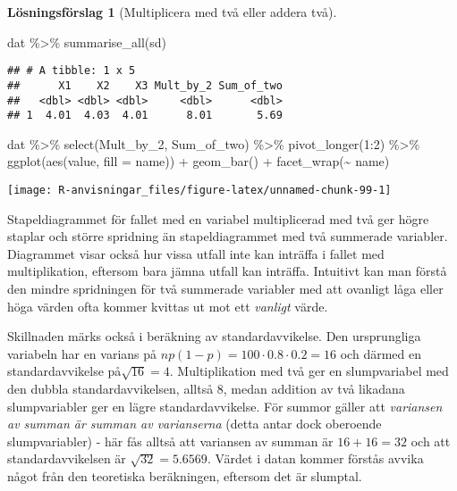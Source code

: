 \documentclass[
]{book}
\newenvironment{Shaded}{\begin{snugshade}}{\end{snugshade}}
\newcommand{\AttributeTok}[1]{\textcolor[rgb]{0.77,0.63,0.00}{#1}}
\newcommand{\DecValTok}[1]{\textcolor[rgb]{0.00,0.00,0.81}{#1}}
\newcommand{\FunctionTok}[1]{\textcolor[rgb]{0.00,0.00,0.00}{#1}}
\newcommand{\NormalTok}[1]{#1}
\newcommand{\SpecialCharTok}[1]{\textcolor[rgb]{0.00,0.00,0.00}{#1}}
\theoremstyle{definition}
\theoremstyle{definition}
\theoremstyle{definition}
\theoremstyle{definition}
\newtheorem{hypothesis}{Lösningsförslag}[chapter]
\theoremstyle{remark}
\begin{document}
\begin{hypothesis}[Multiplicera med två eller addera två]
\begin{Shaded}
\begin{Highlighting}[]
\NormalTok{dat }\SpecialCharTok{\%\textgreater{}\%} 
  \FunctionTok{summarise\_all}\NormalTok{(sd)}
\end{Highlighting}
\end{Shaded}

\begin{verbatim}
## # A tibble: 1 x 5
##      X1    X2    X3 Mult_by_2 Sum_of_two
##   <dbl> <dbl> <dbl>     <dbl>      <dbl>
## 1  4.01  4.03  4.01      8.01       5.69
\end{verbatim}

\begin{Shaded}
\begin{Highlighting}[]
\NormalTok{dat }\SpecialCharTok{\%\textgreater{}\%} 
  \FunctionTok{select}\NormalTok{(Mult\_by\_2, Sum\_of\_two) }\SpecialCharTok{\%\textgreater{}\%} 
  \FunctionTok{pivot\_longer}\NormalTok{(}\DecValTok{1}\SpecialCharTok{:}\DecValTok{2}\NormalTok{) }\SpecialCharTok{\%\textgreater{}\%} 
  \FunctionTok{ggplot}\NormalTok{(}\FunctionTok{aes}\NormalTok{(value, }\AttributeTok{fill =}\NormalTok{ name)) }\SpecialCharTok{+}
  \FunctionTok{geom\_bar}\NormalTok{() }\SpecialCharTok{+}
  \FunctionTok{facet\_wrap}\NormalTok{(}\SpecialCharTok{\textasciitilde{}}\NormalTok{ name)}
\end{Highlighting}
\end{Shaded}

\begin{center}\texttt{[image: R-anvisningar\_files/figure-latex/unnamed-chunk-99-1]} \end{center}

Stapeldiagrammet för fallet med en variabel multiplicerad med två ger högre staplar och större spridning än stapeldiagrammet med två summerade variabler. Diagrammet visar också hur vissa utfall inte kan inträffa i fallet med multiplikation, eftersom bara jämna utfall kan inträffa. Intuitivt kan man förstå den mindre spridningen för två summerade variabler med att ovanligt låga eller höga värden ofta kommer kvittas ut mot ett \emph{vanligt} värde.

Skillnaden märks också i beräkning av standardavvikelse. Den ursprungliga variabeln har en varians på \(np(1-p) = 100 \cdot 0.8 \cdot 0.2 = 16\) och därmed en standardavvikelse på\(\sqrt{16} = 4\). Multiplikation med två ger en slumpvariabel med den dubbla standardavvikelsen, alltså 8, medan addition av två likadana slumpvariabler ger en lägre standardavvikelse. För summor gäller att \emph{variansen av summan är summan av varianserna} (detta antar dock oberoende slumpvariabler) - här fås alltså att variansen av summan är \(16+16=32\) och att standardavvikelsen är \(\sqrt{32} = 5.6569\). Värdet i datan kommer förstås avvika något från den teoretiska beräkningen, eftersom det är slumptal.
\end{hypothesis}
\end{document}
